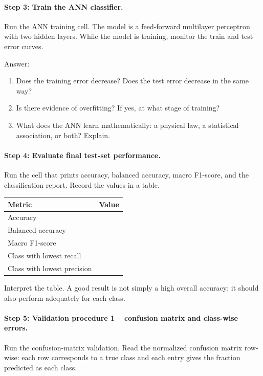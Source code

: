 \paragraph{Step 3: Train the ANN classifier.}
Run the ANN training cell. The model is a feed-forward multilayer perceptron with two hidden layers. While the model is training, monitor the train and test error curves.

Answer:
\begin{enumerate}
    \item Does the training error decrease? Does the test error decrease in the same way?
    \item Is there evidence of overfitting? If yes, at what stage of training?
    \item What does the ANN learn mathematically: a physical law, a statistical association, or both? Explain.
\end{enumerate}

\paragraph{Step 4: Evaluate final test-set performance.}
Run the cell that prints accuracy, balanced accuracy, macro F1-score, and the classification report. Record the values in a table.

\begin{center}
\begin{tabular}{l l}
\hline
Metric & Value \\
\hline
Accuracy & \\
Balanced accuracy & \\
Macro F1-score & \\
Class with lowest recall & \\
Class with lowest precision & \\
\hline
\end{tabular}
\end{center}

Interpret the table. A good result is not simply a high overall accuracy; it should also perform adequately for each class.

\paragraph{Step 5: Validation procedure 1 -- confusion matrix and class-wise errors.}
Run the confusion-matrix validation. Read the normalized confusion matrix row-wise: each row corresponds to a true class and each entry gives the fraction predicted as each class.

